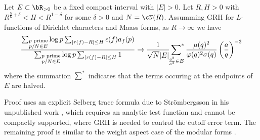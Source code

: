 \begin{theorem}
    Let $E \subset \bR_{>0}$ be a fixed compact interval with $|E| > 0$.
    Let $R, H > 0$ with $R^{\frac{5}{6} + \delta} < H < R^{1 - \delta}$ for some $\delta > 0$ and $N = \cN(R)$.
    Assumming GRH for $L$-functions of Dirichlet characters and Maass forms, as $R \to \infty$ we have 
    \begin{equation}
        \frac{\sum_{\substack{p\text{ prime} \\ p / N \in E}} \log p \sum_{|r(f) - R| \le H} \epsilon(f) a_{f}(p)}{\sum_{\substack{p\text{ prime} \\ p / N \in E}} \log p \sum_{|r(f) - R| \le H} 1} \to \frac{1}{\sqrt{N}|E|}  \sideset{}{^{*}}\sum_{\frac{q^2}{a^2} \in E}  \frac{\mu(q)^2}{\varphi(q)^2 \sigma(q)} \left(\frac{a}{q}\right)^{-3}
    \end{equation}
    where the summation $\sum^{*}$ indicates that the terms occuring at the endpoints of $E$ are halved. 
\end{theorem}

Proof uses an explicit Selberg trace formula due to Str\"ombergsson in his unpublished work \cite{strombergsson}, which requires an analytic test function and cannot be compactly supported, where GRH is needed to control the cutoff error term.
The remaining proof is similar to the weight aspect case of the modular forms \cite{bober2023murmurations}.


